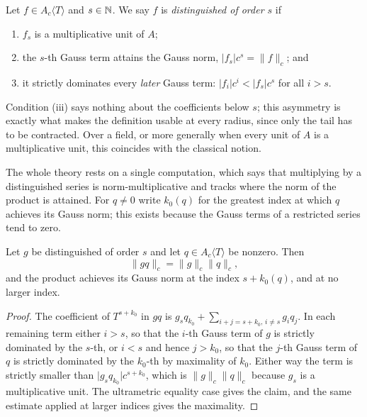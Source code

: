 \begin{definition}
  \label{def:ismuldistinguished}
  \leanok
  Let $f \in A_c\langle T \rangle$ and $s \in \mathbb{N}$.  We say $f$ is \emph{distinguished of order
  $s$} if
  \begin{enumerate}
    \item $f_s$ is a multiplicative unit of $A$;
    \item the $s$-th Gauss term attains the Gauss norm, $\lvert f_s \rvert c^s = \lVert f
      \rVert_c$; and
    \item it strictly dominates every \emph{later} Gauss term: $\lvert f_i \rvert c^i < \lvert
      f_s \rvert c^s$ for all $i > s$.
  \end{enumerate}
\end{definition}

Condition (iii) says nothing about the coefficients below $s$; this asymmetry is exactly what
makes the definition usable at every radius, since only the tail has to be contracted.  Over a
field, or more generally when every unit of $A$ is a multiplicative unit, this coincides with the
classical notion.

The whole theory rests on a single computation, which says that multiplying by a distinguished
series is norm-multiplicative and tracks where the norm of the product is attained.  For $q \neq
0$ write $k_0(q)$ for the greatest index at which $q$ achieves its Gauss norm; this exists
because the Gauss terms of a restricted series tend to zero.

\begin{lemma}
  \label{lem:martin126}
  \leanok
  Let $g$ be distinguished of order $s$ and let $q \in A_c\langle T\rangle$ be nonzero.  Then
  \[
    \lVert g q \rVert_c = \lVert g \rVert_c \lVert q \rVert_c,
  \]
  and the product achieves its Gauss norm at the index $s + k_0(q)$, and at no larger index.
\end{lemma}

\begin{proof}
  \leanok
  The coefficient of $T^{s + k_0}$ in $gq$ is $g_s q_{k_0} + \sum_{i + j = s + k_0, \, i \neq s}
  g_i q_j$.  In each remaining term either $i > s$, so that the $i$-th Gauss term of $g$ is
  strictly dominated by the $s$-th, or $i < s$ and hence $j > k_0$, so that the $j$-th Gauss term
  of $q$ is strictly dominated by the $k_0$-th by maximality of $k_0$.  Either way the term is
  strictly smaller than $\lvert g_s q_{k_0}\rvert c^{s + k_0}$, which is $\lVert g \rVert_c
  \lVert q \rVert_c$ because $g_s$ is a multiplicative unit.  The ultrametric equality case gives
  the claim, and the same estimate applied at larger indices gives the maximality.
\end{proof}

